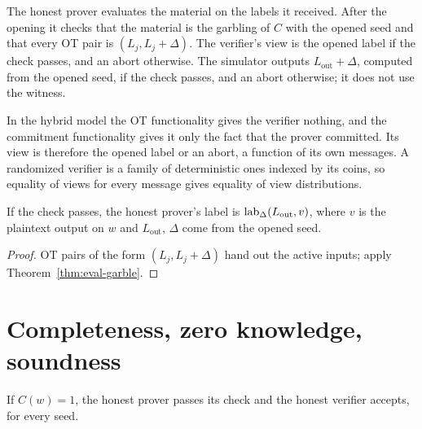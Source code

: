 \begin{definition}
  \label{def:view}
  \leanok
  The honest prover evaluates the material on the labels it received. After the opening it checks
  that the material is the garbling of $C$ with the opened seed and that every OT pair is
  $(L_j, L_j + \Delta)$. The verifier's view is the opened label if the check passes, and an abort
  otherwise. The simulator outputs $L_{\mathrm{out}} + \Delta$, computed from the opened seed, if
  the check passes, and an abort otherwise; it does not use the witness.
\end{definition}

In the hybrid model the OT functionality gives the verifier nothing, and the commitment
functionality gives it only the fact that the prover committed. Its view is therefore the opened
label or an abort, a function of its own messages. A randomized verifier is a family of
deterministic ones indexed by its coins, so equality of views for every message gives equality
of view distributions.

\begin{lemma}
  \label{lem:prover-label}
  \leanok
  If the check passes, the honest prover's label is $\operatorname{lab}_\Delta(L_{\mathrm{out}}, v)$, where $v$
  is the plaintext output on $w$ and $L_{\mathrm{out}}$, $\Delta$ come from the opened seed.
\end{lemma}

\begin{proof}
  \leanok
  OT pairs of the form $(L_j, L_j + \Delta)$ hand out the active inputs; apply
  Theorem~\ref{thm:eval-garble}.
\end{proof}

\section{Completeness, zero knowledge, soundness}

\begin{theorem}[Completeness]
  \label{thm:complete}
  \leanok
  If $C(w) = 1$, the honest prover passes its check and the honest verifier accepts, for every
  seed.
\end{theorem}

